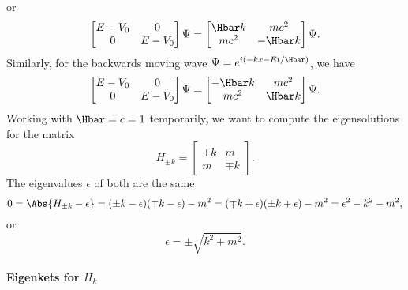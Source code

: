 or
\begin{dmath}\label{eqn:gradQuantumProblemSet4Problem3:40}
\begin{bmatrix}
E - V_0 & 0 \\
0 & E - V_0
\end{bmatrix}
\Psi
=
\begin{bmatrix}
\Hbar k & m c^2 \\
m c^2 &  - \Hbar k
\end{bmatrix}
\Psi.
\end{dmath}
%
Similarly, for the backwards moving wave \( \Psi = e^{i(-k x - E t/\Hbar)} \), we have
%
\begin{dmath}\label{eqn:gradQuantumProblemSet4Problem3:60}
\begin{bmatrix}
E - V_0 & 0 \\
0 & E - V_0
\end{bmatrix}
\Psi
=
\begin{bmatrix}
-\Hbar k & m c^2 \\
m c^2 & \Hbar k
\end{bmatrix}
\Psi.
\end{dmath}
%
Working with \( \Hbar = c = 1 \) temporarily, we want to compute the eigensolutions for the matrix
%
\begin{dmath}\label{eqn:gradQuantumProblemSet4Problem3:80}
H_{\pm k}
=
\begin{bmatrix}
\pm k & m \\
m & \mp k
\end{bmatrix}.
\end{dmath}
%
The eigenvalues \( \epsilon \) of both are the same
%
\begin{dmath}\label{eqn:gradQuantumProblemSet4Problem3:100}
0
=
\Abs{ H_{\pm k} - \epsilon }
=
(\pm k - \epsilon)(\mp k - \epsilon) - m^2
=
(\mp k + \epsilon)(\pm k + \epsilon) - m^2
=
\epsilon^2 - k^2 - m^2,
\end{dmath}
%
or
%
\begin{dmath}\label{eqn:gradQuantumProblemSet4Problem3:120}
\epsilon = \pm \sqrt{k^2 + m^2}.
\end{dmath}
%
\paragraph{Eigenkets for \( H_k \)}

